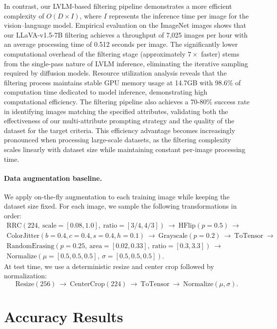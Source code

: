 \documentclass[10pt]{article} %
\newcommand{\llava}{LLaVA-v1.5\xspace}
\begin{document}
In contrast, our LVLM-based filtering pipeline demonstrates a more efficient complexity of $O(D \times I)$, where $I$ represents the inference time per image for the vision--language model. Empirical evaluation on the ImageNet images shows that our \llava{}-7B filtering achieves a throughput of 7,025 images per hour with an average processing time of 0.512 seconds per image. The significantly lower computational overhead of the filtering stage (approximately $7\times$ faster) stems from the single-pass nature of LVLM inference, eliminating the iterative sampling required by diffusion models. Resource utilization analysis reveals that the filtering process maintains stable GPU memory usage at 14.7GB with 98.6\% of computation time dedicated to model inference, demonstrating high computational efficiency. The filtering pipeline also achieves a 70-80\% success rate in identifying images matching the specified attributes, validating both the effectiveness of our multi-attribute prompting strategy and the quality of the dataset for the target criteria. This efficiency advantage becomes increasingly pronounced when processing large-scale datasets, as the filtering complexity scales linearly with dataset size while maintaining constant per-image processing time.
\paragraph{Data augmentation baseline.}
We apply on-the-fly augmentation to each training image while keeping the dataset size fixed.
For each image, we sample the following transformations in order:
\[
\begin{array}{l}
\text{RRC}(224,\ \text{scale}=[0.08,1.0],\ \text{ratio}=[3/4,4/3])\ \rightarrow\
\text{HFlip}(p=0.5)\ \rightarrow\\
\text{ColorJitter}(b=0.4,c=0.4,s=0.4,h=0.1)\ \rightarrow\
\text{Grayscale}(p=0.2)\ \rightarrow\
\text{ToTensor}\ \rightarrow\\
\text{RandomErasing}(p=0.25,\ \text{area}=[0.02,0.33],\ \text{ratio}=[0.3,3.3])\ \rightarrow\\
\text{Normalize}(\mu=[0.5,0.5,0.5],\ \sigma=[0.5,0.5,0.5]).
\end{array}
\]
At test time, we use a deterministic resize and center crop followed by normalization:
\[
\text{Resize}(256)\ \rightarrow\ \text{CenterCrop}(224)\ \rightarrow\ \text{ToTensor}\ \rightarrow\
\text{Normalize}(\mu,\sigma).
\]

\section{Accuracy Results}
\label{sec:appendix_acc}
\end{document}
